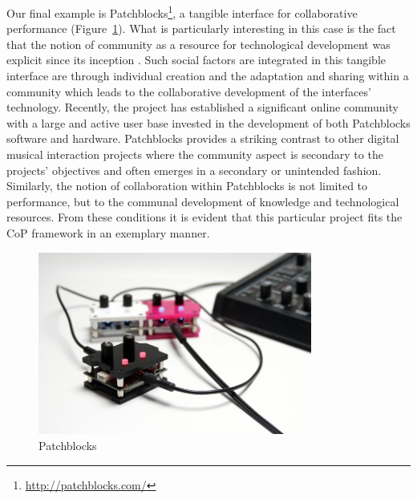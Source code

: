 Our final example is Patchblocks\footnote{\url{http://patchblocks.com/}}, a tangible interface for collaborative performance (Figure~\ref{Marquez-Borbon:fig:patchblocks}). What is particularly interesting in this case is the fact that the notion of community as a resource for technological development was explicit since its inception \cite{Heinz:2010}. Such social factors are integrated in this tangible interface are through individual creation and the adaptation and sharing within a community which leads to the collaborative development of the interfaces' technology. Recently, the project has established a significant online community with a large and active user base invested in the development of both Patchblocks software and hardware. Patchblocks provides a striking contrast to other digital musical interaction projects where the community aspect is secondary to the projects' objectives and often emerges in a secondary or unintended fashion. Similarly, the notion of collaboration within Patchblocks is not limited to performance, but to the communal development of knowledge and technological resources. From these conditions it is evident that this particular project fits the CoP framework in an exemplary manner.  

\begin{figure}[t]
	\centering
		\includegraphics[width=9cm]{Patchblocks.jpg}
	\caption{Patchblocks}
	\label{Marquez-Borbon:fig:patchblocks}
\end{figure}


